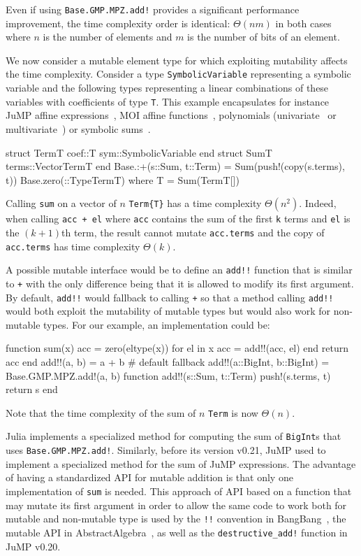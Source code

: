 \documentclass{juliacon}
\begin{document}
Even if using \lstinline|Base.GMP.MPZ.add!| provides a significant performance improvement,
the time complexity order is identical: $\Theta(nm)$ in both cases where $n$ is the number of elements and $m$ is the number of bits of an element.

We now consider a mutable element type for which exploiting mutability affects the time complexity.
Consider a type \lstinline|SymbolicVariable| representing a symbolic variable and the following types representing a linear combinations of these variables with coefficients of type \lstinline|T|.
This example encapsulates for instance JuMP affine expressions~\cite{dunning2017jump}, MOI affine functions~\cite{legat2021mathoptinterface}, polynomials (univariate~\cite{verzani2021polynomials} or multivariate~\cite{legat2021multivariatepolynomials}) or symbolic sums~\cite{gowda2021high}.
\begin{jllisting}
struct Term{T}
    coef::T
    sym::SymbolicVariable
end
struct Sum{T}
    terms::Vector{Term{T}}
end
Base.:+(s::Sum, t::Term) = Sum(push!(copy(s.terms), t))
Base.zero(::Type{Term{T}}) where {T} = Sum(Term{T}[])
\end{jllisting}
Calling \lstinline|sum| on a vector of $n$ \lstinline|Term{T}| has a time complexity $\Theta(n^2)$.
Indeed, when calling \lstinline|acc + el| where \lstinline|acc| contains the sum of the first \lstinline|k| terms and \lstinline|el| is the $(k+1)$th term,
the result cannot mutate \lstinline|acc.terms| and the copy of \lstinline|acc.terms| has time complexity $\Theta(k)$.

A possible mutable interface would be to define an \lstinline|add!!| function
that is similar to \lstinline|+| with the only difference being that it
is allowed to modify its first argument.
By default, \lstinline|add!!| would fallback to calling \lstinline|+|
so that a method calling \lstinline|add!!| would both exploit the mutability
of mutable types but would also work for non-mutable types.
For our example, an implementation could be:
\begin{jllisting}
function sum(x)
    acc = zero(eltype(x))
    for el in x
        acc = add!!(acc, el)
    end
    return acc
end
add!!(a, b) = a + b # default fallback
add!!(a::BigInt, b::BigInt) = Base.GMP.MPZ.add!(a, b)
function add!!(s::Sum, t::Term)
    push!(s.terms, t)
    return s
end
\end{jllisting}
Note that the time complexity of the sum of $n$ \lstinline|Term| is now $\Theta(n)$.

Julia implements a specialized method for computing the sum of \lstinline|BigInt|s that uses \lstinline|Base.GMP.MPZ.add!|.
Similarly, before its version v0.21, JuMP used to implement a specialized method for the sum of JuMP expressions.
The advantage of having a standardized API for mutable addition is that
only one implementation of \lstinline|sum| is needed.
This approach of API based on a function that may mutate its first argument in order to allow the same code to work both for mutable and non-mutable type is
used by the \lstinline|!!| convention in BangBang~\cite{takafumi2021bangbang},
the mutable API in AbstractAlgebra~\cite{AbstractAlgebra.jl-2017},
as well as the \lstinline|destructive_add!| function in JuMP v0.20.
\end{document}
